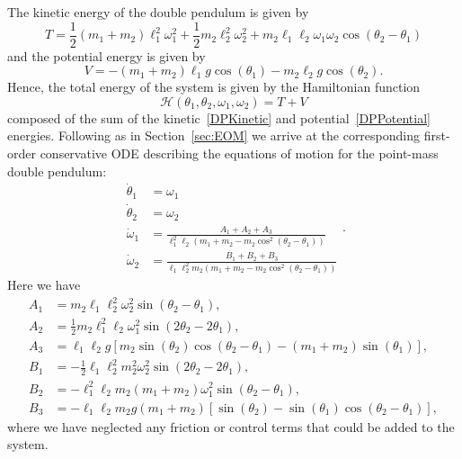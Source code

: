 \documentclass[11pt]{article}
\numberwithin{equation}{section}
\theoremstyle{plain}
\begin{document}
The kinetic energy of the double pendulum is given by
\begin{equation}\label{DPKinetic}
	T = \frac{1}{2}(m_1+m_2)\ell_1^2\omega_1^2+\frac{1}{2}m_2\ell_2^2\omega_2^2+m_2\ell_1\ell_2\omega_1\omega_2\cos(\theta_2 - \theta_1)
\end{equation}
and the potential energy is given by
\begin{equation}\label{DPPotential}
	V = -(m_1+m_2)\ell_1g\cos(\theta_1) - m_2\ell_2g\cos(\theta_2).	
\end{equation}
Hence, the total energy of the system is given by the Hamiltonian function 
\begin{equation}\label{DPHamiltonian}
	\mathcal{H}(\theta_1,\theta_2,\omega_1,\omega_2) = T + V
\end{equation}
composed of the sum of the kinetic~\eqref{DPKinetic} and potential~\eqref{DPPotential} energies. Following as in Section~\ref{sec:EOM} we arrive at the corresponding first-order conservative ODE describing the equations of motion for the point-mass double pendulum:
\begin{equation}\label{DPeom}
	\begin{split}
        \dot{\theta}_1&=\omega_1\\
        \dot{\theta}_2&=\omega_2\\
        \dot{\omega}_1&=\frac{A_1+A_2+A_3}{\ell_1^2\ell_2(m_1+m_2-m_2\cos^2(\theta_2 - \theta_1))}\\
        \dot{\omega}_2&=\frac{B_1+B_2+B_3}{\ell_1\ell_2^2m_2(m_1+m_2 - m_2\cos^2(\theta_2 - \theta_1))}
    \end{split}.
\end{equation}
Here we have 
\begin{equation}\label{DPeom2}
	\begin{split}
		A_1 &=m_2\ell_1\ell_2^2\omega_2^2\sin(\theta_2 - \theta_1),\\
        A_2 &=\frac{1}{2}m_2\ell_1^2\ell_2\omega_1^2\sin(2\theta_2 - 2\theta_1),\\
        A_3 &= \ell_1\ell_2g[m_2\sin(\theta_2)\cos(\theta_2 - \theta_1)-(m_1+m_2)\sin(\theta_1)],\\
        B_1 &=-\frac{1}{2}\ell_1\ell_2^2m_2^2\omega_2^2\sin(2\theta_2 - 2\theta_1),\\
        B_2 &=-\ell_1^2\ell_2m_2(m_1+m_2)\omega_1^2\sin(\theta_2 - \theta_1),\\
        B_3 &=-\ell_1\ell_2m_2g(m_1+m_2)[\sin(\theta_2)-\sin(\theta_1)\cos(\theta_2 - \theta_1)],
	\end{split}
\end{equation}
where we have neglected any friction or control terms that could be added to the system.  
\end{document}
